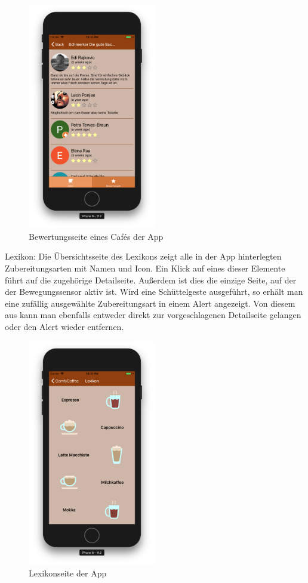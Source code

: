 \begin{figure}[H]
    \centering
		\includegraphics[width=0.5\textwidth]{Bilder/app-bewertungen.png}
		\caption{Bewertungsseite eines Cafés der App}
\end{figure}


Lexikon:
Die Übersichtsseite des Lexikons zeigt alle in der App hinterlegten Zubereitungsarten mit Namen und Icon.
Ein Klick auf eines dieser Elemente führt auf die zugehörige Detailseite.
Außerdem ist dies die einzige Seite, auf der der Bewegungssensor aktiv ist.
Wird eine Schüttelgeste ausgeführt, so erhält man eine zufällig ausgewählte Zubereitungsart in einem Alert angezeigt.
Von diesem aus kann man ebenfalls entweder direkt zur vorgeschlagenen Detailseite gelangen oder den Alert wieder entfernen.

\begin{figure}[H]
    \centering
		\includegraphics[width=0.5\textwidth]{Bilder/app-lexikon.png}
		\caption{Lexikonseite der App}
\end{figure}


